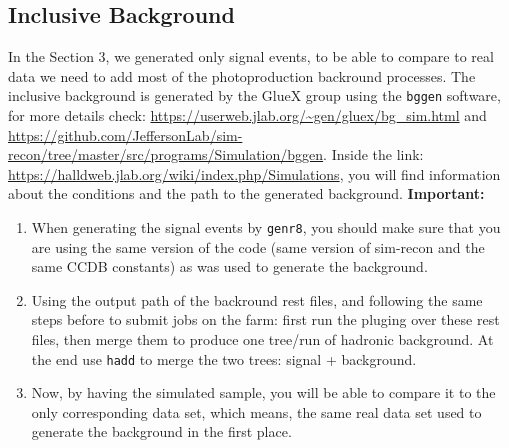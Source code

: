 \documentclass{article}
\begin{document}
\subsection{Inclusive Background}
In the Section 3, we generated only signal events, to be able to compare to real data we need to add most of the photoproduction backround processes. The inclusive background is generated by the GlueX group using the \texttt{bggen} software, for more details check: \url{https://userweb.jlab.org/~gen/gluex/bg_sim.html} and \url{https://github.com/JeffersonLab/sim-recon/tree/master/src/programs/Simulation/bggen}.
\newline Inside the link: \url{https://halldweb.jlab.org/wiki/index.php/Simulations}, you will find information about the conditions and the path to the generated background.
\bigbreak
\textbf{Important:}
\begin{enumerate}
\item When generating the signal events by \texttt{genr8}, you should make sure that you are using the same version of the code (same version of sim-recon and the same CCDB constants) as was used to generate the background.
\item Using the output path of the backround rest files, and following the same steps before to submit jobs on the farm: first run the pluging over these rest files, then merge them to produce one tree/run of hadronic background. At the end use \texttt{hadd} to merge the two trees: signal + background.
\item Now, by having the simulated sample, you will be able to compare it to the only corresponding data set, which means, the same real data set used to generate the background in the first place. 
\end{enumerate}
\end{document}
